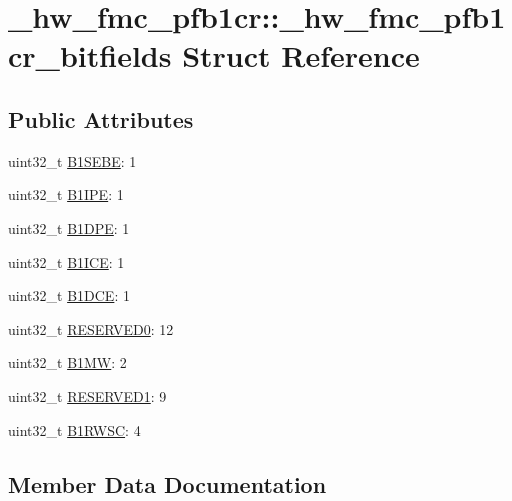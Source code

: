 \hypertarget{struct__hw__fmc__pfb1cr_1_1__hw__fmc__pfb1cr__bitfields}{}\section{\+\_\+hw\+\_\+fmc\+\_\+pfb1cr\+:\+:\+\_\+hw\+\_\+fmc\+\_\+pfb1cr\+\_\+bitfields Struct Reference}
\label{struct__hw__fmc__pfb1cr_1_1__hw__fmc__pfb1cr__bitfields}
\subsection*{Public Attributes}
\begin{DoxyCompactItemize}
\item 
uint32\+\_\+t \hyperlink{struct__hw__fmc__pfb1cr_1_1__hw__fmc__pfb1cr__bitfields_a5fa58b24fb22c88965bfbdf84e2ac529}{B1\+S\+E\+BE}\+: 1
\item 
uint32\+\_\+t \hyperlink{struct__hw__fmc__pfb1cr_1_1__hw__fmc__pfb1cr__bitfields_a718428b30b37300410e29ae201f2616f}{B1\+I\+PE}\+: 1
\item 
uint32\+\_\+t \hyperlink{struct__hw__fmc__pfb1cr_1_1__hw__fmc__pfb1cr__bitfields_af20546ea46c8f65d1f3318f61d607d44}{B1\+D\+PE}\+: 1
\item 
uint32\+\_\+t \hyperlink{struct__hw__fmc__pfb1cr_1_1__hw__fmc__pfb1cr__bitfields_aae11ac0c2577f1cfd35669a181172aa5}{B1\+I\+CE}\+: 1
\item 
uint32\+\_\+t \hyperlink{struct__hw__fmc__pfb1cr_1_1__hw__fmc__pfb1cr__bitfields_a08be2f8cb9766708a10982991aa336a6}{B1\+D\+CE}\+: 1
\item 
uint32\+\_\+t \hyperlink{struct__hw__fmc__pfb1cr_1_1__hw__fmc__pfb1cr__bitfields_acfe5ab2389ba8277932d94d3cc23d2fb}{R\+E\+S\+E\+R\+V\+E\+D0}\+: 12
\item 
uint32\+\_\+t \hyperlink{struct__hw__fmc__pfb1cr_1_1__hw__fmc__pfb1cr__bitfields_aa06a0beb7e7468008b05fb6efea3ff3f}{B1\+MW}\+: 2
\item 
uint32\+\_\+t \hyperlink{struct__hw__fmc__pfb1cr_1_1__hw__fmc__pfb1cr__bitfields_aa0a88418996eaf7be19c15e35ca4322f}{R\+E\+S\+E\+R\+V\+E\+D1}\+: 9
\item 
uint32\+\_\+t \hyperlink{struct__hw__fmc__pfb1cr_1_1__hw__fmc__pfb1cr__bitfields_aba1214a7401bca9fa603eebb82fe561c}{B1\+R\+W\+SC}\+: 4
\end{DoxyCompactItemize}


\subsection{Member Data Documentation}
